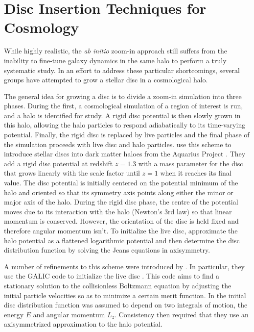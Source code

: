 \section{Disc Insertion Techniques for Cosmology}

While highly realistic, the \textit{ab initio} zoom-in approach still suffers from the inability to fine-tune galaxy dynamics in the same halo to perform a truly systematic study. In an effort to address these particular shortcomings, several groups have attempted to grow a stellar disc in a cosmological halo.  


The general idea for growing a disc is to divide a zoom-in simulation into three phases.  During the first, a cosmological simulation of a region of interest is run, and a halo is identified for study.  A rigid disc potential is then slowly grown in this halo, allowing the halo particles to respond adiabatically to its time-varying potential.  Finally, the rigid disc is replaced by live particles and the final phase of the simulation proceeds with live disc and halo particles.  \citet{debuhr_2012} use this scheme to introduce stellar discs into dark matter haloes from the Aquarius Project \citep{springel2008}.  They add a rigid disc potential at redshift $z=1.3$ with a mass parameter for the disc that grows linearly with the scale factor until $z=1$ when it reaches its final value.  The disc potential is initially centered on the potential minimum of the halo and oriented so that its symmetry axis points along either the minor or major axis of the halo.  During the rigid disc phase, the centre of the potential moves due to its interaction with the halo (Newton's 3rd law) so that linear momentum is conserved.  However, the orientation of the disc is held fixed and therefore angular momentum isn't.  To initialize the live disc, \citet{debuhr_2012} approximate the halo potential as a flattened logarithmic potential and then determine the disc distribution function by solving the Jeans equations in axisymmetry. 

A number of refinements to this scheme were introduced by \citet{ys_2015}.  In particular, they use the GALIC code to initialize the live disc \citet{YurinSpringelGalic}.  This code aims to find a stationary solution to the collisionless Boltzmann equation by adjusting the initial particle velocities so as to minimize a certain merit function.  In \citet{ys_2015} the initial disc distribution function was assumed to depend on two integrals of motion, the energy $E$ and angular momentum $L_z$.  Consistency then required that they use an axisymmetrized approximation to the halo potential.

